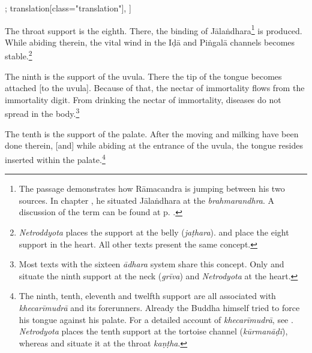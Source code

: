 \begin{alignment}[
  texts=edition[class="edition"];
  translation[class="translation"],
  ]
\begin{translation}
\begin{tlate}
      The throat support is the eighth. There, the binding of Jālaṅdhara\footnote{The passage demonstrates how Rāmacandra is jumping between his two sources. In chapter , he situated Jālaṅdhara at the \textit{brahmarandhra}. A discussion of the term can be found at p. \pageref{cakra8trans}.} is produced. While abiding therein, the vital wind in the Iḍā and Piṅgalā channels becomes stable.\footnote{\textit{Netroddyota} places the support at the belly (\textit{jaṭhara}).  and  place the eight support in the heart. All other texts present the same concept.}

      The ninth is the support of the uvula. There the tip of the tongue becomes attached [to the uvula]. Because of that, the nectar of immortality flows from the immortality digit. From drinking the nectar of immortality, diseases do not spread in the body.\footnote{Most texts with the sixteen \textit{ādhara} system share this concept. Only  and  situate the ninth support at the neck (\textit{grīva}) and \textit{Netrodyota} at the heart.} 
      
      The tenth is the support of the palate. After the moving and milking have been done therein, [and] while abiding at the entrance of the uvula, the tongue resides inserted within the palate.\footnote{The ninth, tenth, eleventh and twelfth support are all associated with \textit{khecarīmudrā} and its forerunners. Already the Buddha himself tried to force his tongue against his palate. For a detailed account of \textit{khecarīmudrā}, see \citeauthor{mallinson2010}. \textit{Netrodyota} places the tenth support at the tortoise channel (\textit{kūrmanāḍī}), whereas  and  situate it at the throat \textit{kaṇṭha}.}
      \clearpage 
     \end{tlate}
  \end{translation}
\end{alignment}
\pagebreak %
